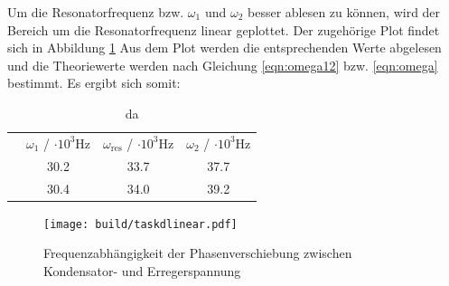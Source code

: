 Um die Resonatorfrequenz bzw. $\omega_1$ und $\omega_2$ besser ablesen zu können, wird der Bereich um die Resonatorfrequenz linear geplottet.
Der zugehörige Plot findet sich in Abbildung \ref{fig:phasenplotlinear}
Aus dem Plot werden die entsprechenden Werte abgelesen und die Theoriewerte werden nach Gleichung \eqref{eqn:omega12} bzw. \eqref{eqn:omega} bestimmt.
Es ergibt sich somit:
\begin{table}
	\caption{da}
	\centering
	\label{tab:senseless_table}
	\begin{tabular}{cccc}
		\toprule
		 &$\omega_1$ / $ \cdot 10^{3} \si{\Hz}$ &$\omega_{\mathrm{res}}$ / $ \cdot 10^{3} \si{\Hz}$&$\omega_2$ / $ \cdot 10^{3} \si{\Hz}$\\
		 \text{Abgelesen}&30.2&33.7&37.7\\
		 \text{Theoriewert}&30.4&34.0&39.2\\
	\bottomrule
	\end{tabular}
\end{table}
\begin{figure}
	\centering
	\texttt{[image: build/taskdlinear.pdf]}
	\caption{Frequenzabhängigkeit der Phasenverschiebung zwischen Kondensator- und Erregerspannung}
	\label{fig:phasenplotlinear}
\end{figure}
